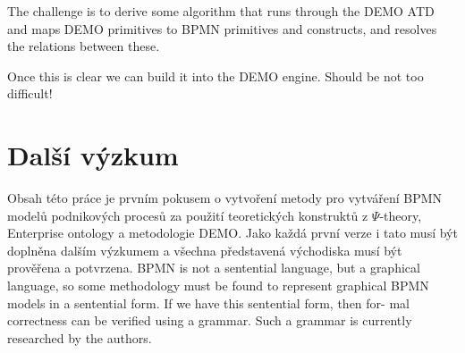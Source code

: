 \documentclass[]{article}
\newcommand{\ptheory}{$\Psi$-theory}
\begin{document}
The challenge is to derive some algorithm that runs through the DEMO ATD and maps DEMO
primitives to BPMN primitives and constructs, and resolves the relations between these.

Once this is clear we can build it into the DEMO engine. Should be not too difficult!

\section{Další výzkum}

Obsah této práce je prvním pokusem o vytvoření metody pro vytváření BPMN modelů podnikových procesů za použití teoretických konstruktů z \ptheory, Enterprise ontology a metodologie DEMO. Jako každá první verze i tato musí být doplněna dalším výzkumem a všechna představená východiska musí být prověřena a potvrzena.
BPMN is not a sentential language, but a graphical language, so some methodology must be found to represent graphical BPMN models in a sentential form. If we have this sentential form, then for- mal correctness can be verified using a grammar. Such a grammar is currently researched by the authors.

\nocite{*}


\end{document}
